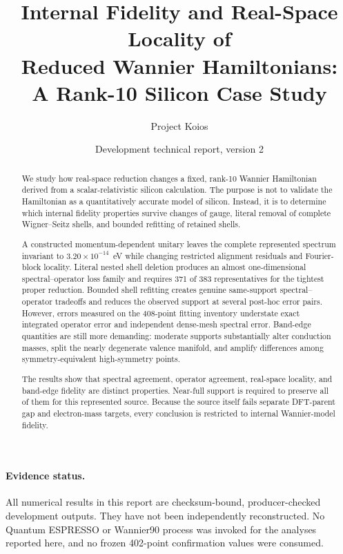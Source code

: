 \documentclass[11pt]{article}
\title{Internal Fidelity and Real-Space Locality of\\Reduced Wannier Hamiltonians:\\A Rank-10 Silicon Case Study}
\author{Project Koios}
\date{Development technical report, version 2}
\begin{document}
\maketitle

\begin{abstract}
We study how real-space reduction changes a fixed, rank-10 Wannier Hamiltonian derived
from a scalar-relativistic silicon calculation.  The purpose is not to validate the
Hamiltonian as a quantitatively accurate model of silicon.  Instead, it is to determine
which internal fidelity properties survive changes of gauge, literal removal of complete
Wigner--Seitz shells, and bounded refitting of retained shells.

A constructed momentum-dependent unitary leaves the complete represented spectrum
invariant to \(3.20\times10^{-14}\)~eV while changing restricted alignment residuals and
Fourier-block locality.  Literal nested shell deletion produces an almost
one-dimensional spectral--operator loss family and requires 371 of 383 representatives
for the tightest proper reduction.  Bounded shell refitting creates genuine
same-support spectral--operator tradeoffs and reduces the observed support at several
post-hoc error pairs.  However, errors measured on the 408-point fitting inventory
understate exact integrated operator error and independent dense-mesh spectral error.
Band-edge quantities are still more demanding: moderate supports substantially alter
conduction masses, split the nearly degenerate valence manifold, and amplify differences
among symmetry-equivalent high-symmetry points.

The results show that spectral agreement, operator agreement, real-space locality, and
band-edge fidelity are distinct properties.  Near-full support is required to preserve
all of them for this represented source.  Because the source itself fails separate
DFT-parent gap and electron-mass targets, every conclusion is restricted to internal
Wannier-model fidelity.
\end{abstract}

\paragraph{Evidence status.}
All numerical results in this report are checksum-bound, producer-checked development
outputs.  They have not been independently reconstructed.  No Quantum ESPRESSO or
Wannier90 process was invoked for the analyses reported here, and no frozen 402-point
confirmation values were consumed.
\end{document}
